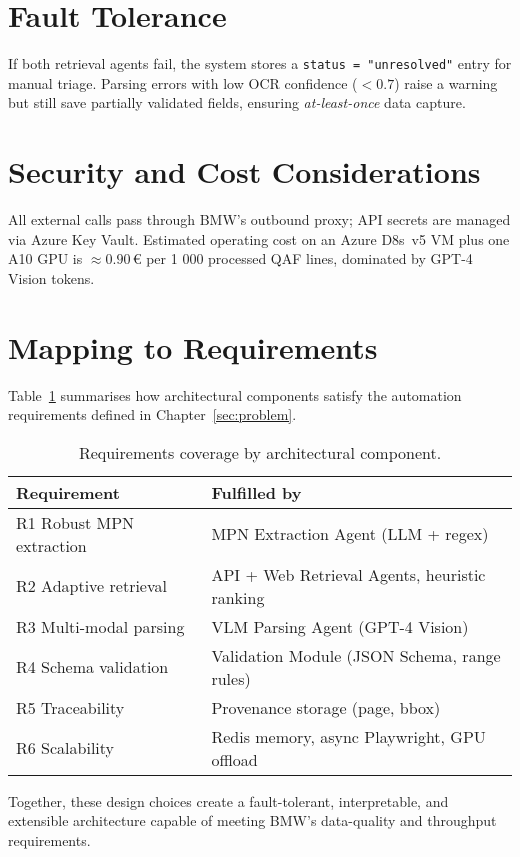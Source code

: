\section{Fault Tolerance}
If both retrieval agents fail, the system stores a \verb|status = "unresolved"| entry for manual triage.  
Parsing errors with low OCR confidence ($<0.7$) raise a warning but still save partially validated fields, ensuring \emph{at-least-once} data capture.

\section{Security and Cost Considerations}
All external calls pass through BMW's outbound proxy; API secrets are managed via Azure Key Vault.  
Estimated operating cost on an Azure D8s~v5 VM plus one A10 GPU is \(\approx 0.90\,€\) per 1 000 processed QAF lines, dominated by GPT-4 Vision tokens.

\section{Mapping to Requirements}
Table~\ref{tab:reqmap} summarises how architectural components satisfy the automation requirements defined in Chapter~\ref{sec:problem}.

\begin{table}[ht]
  \centering
  \caption{Requirements coverage by architectural component.}
  \label{tab:reqmap}
  \begin{tabular}{ll}
    \hline
    Requirement & Fulfilled by \\\hline
    R1 Robust MPN extraction & MPN Extraction Agent (LLM + regex) \\
    R2 Adaptive retrieval    & API + Web Retrieval Agents, heuristic ranking \\
    R3 Multi-modal parsing   & VLM Parsing Agent (GPT-4 Vision) \\
    R4 Schema validation     & Validation Module (JSON Schema, range rules) \\
    R5 Traceability          & Provenance storage (page, bbox) \\
    R6 Scalability           & Redis memory, async Playwright, GPU offload \\\hline
  \end{tabular}
\end{table}

Together, these design choices create a fault-tolerant, interpretable, and extensible architecture capable of meeting BMW's data-quality and throughput requirements.
